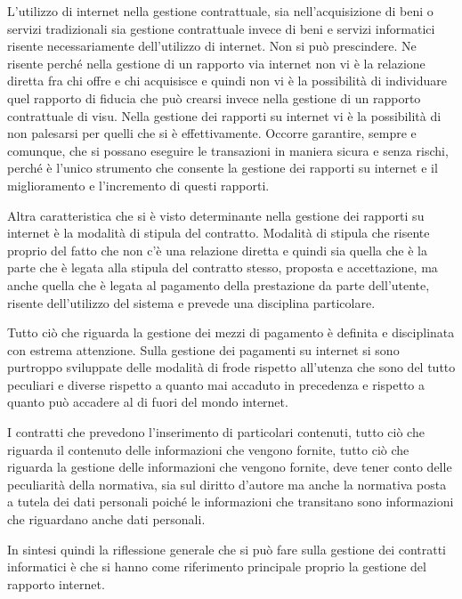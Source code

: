 L'utilizzo di internet nella gestione contrattuale, sia nell'acquisizione di beni o servizi tradizionali sia gestione contrattuale invece di beni e servizi informatici risente necessariamente dell'utilizzo di internet. Non si può prescindere. Ne risente perché nella gestione di un rapporto via internet non vi è la relazione diretta fra chi offre e chi acquisisce e quindi non vi è la possibilità di individuare quel rapporto di fiducia che può crearsi invece nella gestione di un rapporto contrattuale di visu. Nella gestione dei rapporti su internet vi è la possibilità di non palesarsi per quelli che si è effettivamente. Occorre garantire, sempre e comunque, che si possano eseguire le transazioni in maniera sicura e senza rischi, perché è l'unico strumento che consente la gestione dei rapporti su internet e il miglioramento e l'incremento di questi rapporti. 

Altra caratteristica che si è visto determinante nella gestione dei rapporti su internet è la modalità di stipula del contratto. Modalità di stipula che risente proprio del fatto che non c'è una relazione diretta e quindi sia quella che è la parte che è legata alla stipula del contratto stesso,  proposta e accettazione, ma anche quella che è legata al pagamento della prestazione da parte dell'utente, risente dell'utilizzo del sistema e prevede una disciplina particolare.

Tutto ciò che riguarda la gestione dei mezzi di pagamento è definita e disciplinata con estrema attenzione. Sulla gestione dei pagamenti su internet si sono purtroppo sviluppate delle modalità di frode rispetto all'utenza che sono del tutto peculiari e diverse rispetto a quanto mai accaduto in precedenza e rispetto a quanto può accadere al di fuori del mondo internet. 

I contratti che prevedono l'inserimento di particolari contenuti, tutto ciò che riguarda il contenuto delle informazioni che vengono fornite, tutto ciò che riguarda la gestione delle informazioni che vengono fornite, deve tener conto delle peculiarità della normativa, sia sul diritto d'autore ma anche la normativa posta a tutela dei dati personali poiché le informazioni che transitano sono informazioni che riguardano anche dati personali. 

In sintesi quindi la riflessione generale che si può fare sulla gestione dei contratti informatici è che si hanno come riferimento principale proprio la gestione del rapporto internet.